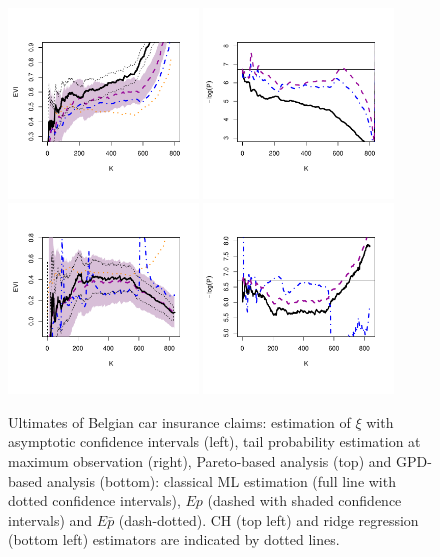 \documentclass[twoside,leqno,11pt]{article}
\begin{document}
\begin{figure}[!ht]
  \centering
\includegraphics[width=0.45\textwidth]{ultimates_evi.pdf} 
\includegraphics[width=0.45\textwidth]{ultimates_tail.pdf} 
\\
\includegraphics[width=0.45\textwidth]{ultimates_gp_evi.pdf} 
\includegraphics[width=0.45\textwidth]{ultimates_gp_tail.pdf} 
  \caption{Ultimates of Belgian car insurance claims: estimation of $\xi$ with asymptotic confidence intervals (left), tail probability estimation at maximum observation (right), Pareto-based analysis (top) and GPD-based analysis (bottom): classical ML estimation (full line with dotted confidence intervals), $Ep$ (dashed with shaded confidence intervals) and $E\bar{p}$ (dash-dotted). CH (top left)  and ridge regression (bottom left) estimators are indicated by dotted lines.}
\end{figure} 
\end{document}
